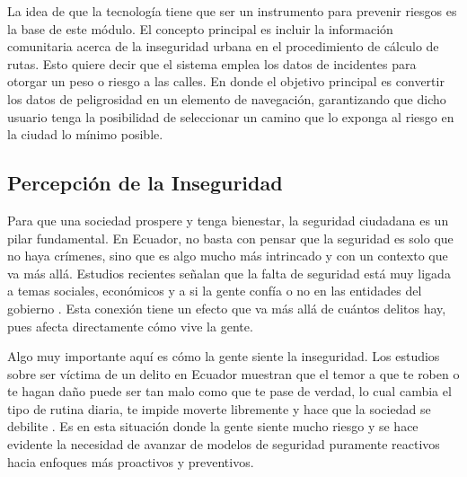 La idea de que la tecnología tiene que ser un instrumento para prevenir riesgos es la base de este módulo. El concepto principal es incluir la información comunitaria acerca de la inseguridad urbana en el procedimiento de cálculo de rutas. Esto quiere decir que el sistema emplea los datos de incidentes para otorgar un peso o riesgo a las calles. En donde el objetivo principal es convertir los datos de peligrosidad en un elemento de navegación, garantizando que dicho usuario tenga la posibilidad de seleccionar un camino que lo exponga al riesgo en la ciudad lo mínimo posible.

\subsection{Percepción de la Inseguridad}
Para que una sociedad prospere y tenga bienestar, la seguridad ciudadana es un pilar fundamental. En Ecuador, no basta con pensar que la seguridad es solo que no haya crímenes, sino que es algo mucho más intrincado y con un contexto que va más allá. Estudios recientes señalan que la falta de seguridad está muy ligada a temas sociales, económicos y a si la gente confía o no en las entidades del gobierno \cite{bravo2024seguridad}. Esta conexión tiene un efecto que va más allá de cuántos delitos hay, pues afecta directamente cómo vive la gente.

Algo muy importante aquí es cómo la gente siente la inseguridad. Los estudios sobre ser víctima de un delito en Ecuador muestran que el temor a que te roben o te hagan daño puede ser tan malo como que te pase de verdad, lo cual cambia el tipo de rutina diaria, te impide moverte libremente y hace que la sociedad se debilite \cite{freire2024analisis}. Es en esta situación donde la gente siente mucho riesgo y se hace evidente la necesidad de avanzar de modelos de seguridad puramente reactivos hacia enfoques más proactivos y preventivos.

